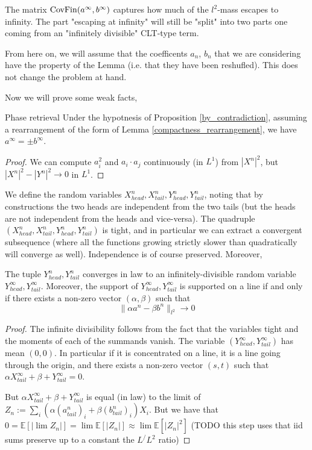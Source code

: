 \documentclass{inprogress}
\begin{document}
The matrix $\operatorname{CovFin}(a^\infty, b^\infty)$ captures how much of the $l^2$-mass escapes to infinity. The part "escaping at infinity" will still be "split" into two parts one coming from an "infinitely divisible" CLT-type term.

From here on, we will assume that the coefficents $a_n$, $b_n$ that we are considering have the property of the Lemma (i.e. that they have been reshufled). This does not change the problem at hand.

Now we will prove some weak facts, 

\begin{lemma} 
    {Phase retrieval}
    Under the hypotnesis of Proposition \ref{by_contradiction}, assuming a rearrangement of the form of Lemma \ref{compactness_rearrangement}, we have
    $
    a^\infty = \pm b^\infty
    $.
\end{lemma}

\begin{proof}
    We can compute $a_i^2$ and $a_i\cdot a_j$ continuously (in $L^1$) from $|X^n|^2$, but $|X^n|^2-|Y^n|^2 \to 0 $ in $L^1$.
\end{proof}

We define the random variables $X^n_{head},X^n_{tail},Y^n_{head},Y^n_{tail}$, noting that by constructions the two heads are independent from the two tails (but the heads are not independent from the heads and vice-versa). The quadruple $(X^n_{head},X^n_{tail},Y^n_{head},Y^n_{tail})$ is tight, and in particular we can extract a convergent subsequence (where all the functions growing strictly slower than quadratically will converge as well). Independence is of course preserved. Moreover,

\begin{lemma}
The tuple $Y^n_{head},Y^n_{tail}$  converges in law to an infinitely-divisible random variable $Y^\infty_{head},Y^\infty_{tail}$. Moreover, the support of $Y^\infty_{head},Y^\infty_{tail}$ is supported on a line if and only if there exists a non-zero vector $(\alpha, \beta)$ such that
$$
\|\alpha a^n - \beta b^n\|_{l^2} \to 0
$$
\end{lemma}

\begin{proof}
    The infinite divisibility follows from the fact that the variables tight and the moments of each of the summands vanish. The variable $(Y^\infty_{head},Y^\infty_{tail})$ has mean $(0,0)$. In particular if it is concentrated on a line, it is a line going through the origin, and there exists a non-zero vector $(s,t)$ such that $\alpha X^\infty_{tail} + \beta+ Y^{\infty}_{tail} = 0$.

    But $\alpha X^\infty_{tail} + \beta+ Y^{\infty}_{tail}$ is equal (in law) to the limit of $Z_n := \sum_{i} (\alpha (a^n_{tail})_i+\beta (b^n_{tail})_i)X_i$. But we have that $0 = \mathbb E [|\lim Z_n|] = \lim \mathbb E [| Z_n|] \approx \lim \mathbb E [| Z_n|^2] $ (TODO this step uses that iid sums preserve up to a constant the $L^/L^2$ ratio)
\end{proof}
\end{document}
